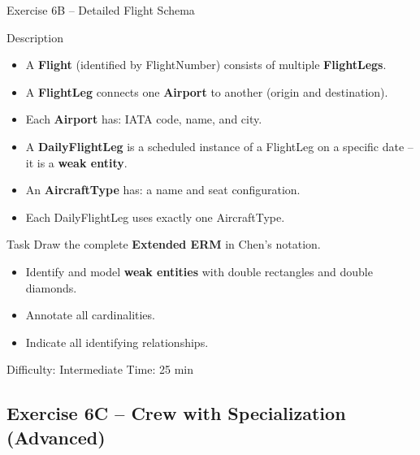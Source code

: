 \documentclass[10pt]{beamer}
\begin{document}
\begin{frame}{Exercise 6B -- Detailed Flight Schema}
  \begin{block}{Description}
    \begin{itemize}
      \item A \textbf{Flight} (identified by FlightNumber) consists of multiple \textbf{FlightLegs}.
      \item A \textbf{FlightLeg} connects one \textbf{Airport} to another (origin and destination).
      \item Each \textbf{Airport} has: IATA code, name, and city.
      \item A \textbf{DailyFlightLeg} is a scheduled instance of a FlightLeg on a specific date -- it is a \textbf{weak entity}.
      \item An \textbf{AircraftType} has: a name and seat configuration.
      \item Each DailyFlightLeg uses exactly one AircraftType.
    \end{itemize}
  \end{block}

  \begin{block}{Task}
    Draw the complete \textbf{Extended ERM} in Chen's notation.
    \begin{itemize}
      \item Identify and model \textbf{weak entities} with double rectangles and double diamonds.
      \item Annotate all cardinalities.
      \item Indicate all identifying relationships.
    \end{itemize}
  \end{block}

  \begin{alertblock}{Difficulty: Intermediate \quad Time: 25 min}
  \end{alertblock}
\end{frame}

\subsection{Exercise 6C -- Crew with Specialization (Advanced)}
\end{document}
